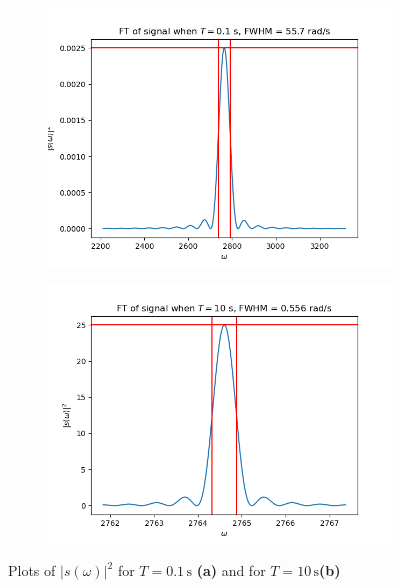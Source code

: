 \documentclass{article}
\begin{document}
\begin{figure}
    \centering
    \begin{subfigure}{.45\textwidth}
        \includegraphics[width=\textwidth]{figs/fouriert_T=0.1.png}
        \subcaption{}
    \end{subfigure}
    \hfill
    \begin{subfigure}{.45\textwidth}
        \includegraphics[width=\textwidth]{figs/fouriert_T=10.png}
        \subcaption{}
    \end{subfigure}
    \caption{Plots of $|s(\omega)|^2$ for $T = 0.1 \,\si{\s}$ \textbf{(a)} and for $T = 10  \,\si{\s}$\textbf{(b)}}
    \label{fig:plot_T}
\end{figure}
\end{document}
